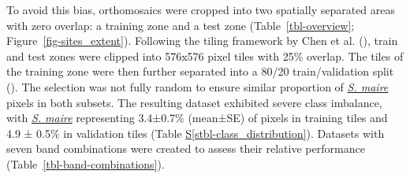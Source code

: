 \documentclass[
]{scrreprt}
\newcommand*\quartostblref[1]{Table \hyperref[#1]{S\ref{#1}}}
\begin{document}
To avoid this bias, orthomosaics were cropped into two spatially
separated areas with zero overlap: a training zone and a test zone
(Table~\ref{tbl-overview}; Figure~\ref{fig-sites_extent}). Following the
tiling framework by Chen et al.
(), train and test zones
were clipped into 576x576 pixel tiles with 25\% overlap. The tiles of
the training zone were then further separated into a 80/20
train/validation split
(). The selection was not fully random to ensure similar proportion
of \hyperref[acronyms_SM]{\emph{S. maire}} pixels in both subsets. The
resulting dataset exhibited severe class imbalance, with
\hyperref[acronyms_SM]{\emph{S. maire}} representing 3.4±0.7\% (mean±SE)
of pixels in training tiles and 4.9 ± 0.5\% in validation tiles
(\quartostblref{stbl-class_distribution}). Datasets with seven band
combinations were created to assess their relative performance
(Table~\ref{tbl-band-combinations}).
\end{document}

